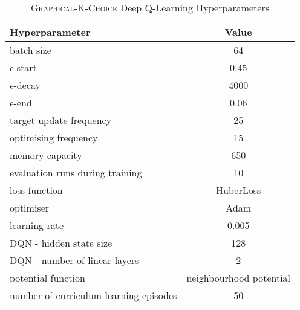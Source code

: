 \begin{table}[h!]\label{tab:graphical-k-choice-hyperparameters}
\begin{threeparttable}
\caption{\textsc{Graphical-K-Choice} Deep Q-Learning Hyperparameters}
\centering
\begin{tabular}{l|c}
\toprule
Hyperparameter             &     Value \\
\midrule
batch size               &     64 \\ 
$\epsilon$-start               &    0.45 \\ 
$\epsilon$-decay         &     4000\\
$\epsilon$-end              &     0.06 \\
target update frequency               &     25 \\ 
optimising frequency          &     15 \\ 
memory capacity     &     650 \\
evaluation runs during training             &     10 \\
loss function               &     HuberLoss \\ 
optimiser        &     Adam \\
learning rate             &     0.005 \\
DQN - hidden state size               &     128 \\ 
DQN - number of linear layers     &     2 \\
potential function            &    neighbourhood potential \\
number of curriculum learning episodes            & 50 \\ 
\bottomrule
\end{tabular}
\end{threeparttable}
\end{table}